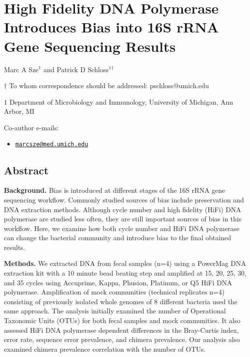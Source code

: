 \documentclass[12pt,]{article}
\title{}
\author{}
\date{}
\providecommand{\tightlist}{%
  \setlength{\itemsep}{0pt}\setlength{\parskip}{0pt}}
\begin{document}
\section{High Fidelity DNA Polymerase Introduces Bias into 16S rRNA Gene
Sequencing
Results}\label{high-fidelity-dna-polymerase-introduces-bias-into-16s-rrna-gene-sequencing-results}

\begin{center}
\vspace{25mm}

Marc A Sze${^1}$ and Patrick D Schloss${^1}$${^\dagger}$

\vspace{20mm}

$\dagger$ To whom correspondence should be addressed: pschloss@umich.edu

$1$ Department of Microbiology and Immunology, University of Michigan, Ann Arbor, MI




\end{center}

Co-author e-mails:

\begin{itemize}
\tightlist
\item
  \href{mailto:marcsze@med.umich.edu}{\nolinkurl{marcsze@med.umich.edu}}
\end{itemize}

\newpage

\linenumbers

\subsection{Abstract}\label{abstract}

\textbf{Background.} Bias is introduced at different stages of the 16S
rRNA gene sequencing workflow. Commonly studied sources of bias include
preservation and DNA extraction methods. Although cycle number and high
fidelity (HiFi) DNA polymerase are studied less often, they are still
important sources of bias in this workflow. Here, we examine how both
cycle number and HiFi DNA polymerase can change the bacterial community
and introduce bias to the final obtained results.

\textbf{Methods.} We extracted DNA from fecal samples (n=4) using a
PowerMag DNA extraction kit with a 10 minute bead beating step and
amplified at 15, 20, 25, 30, and 35 cycles using Accuprime, Kappa,
Phusion, Platinum, or Q5 HiFi DNA polymerase. Amplification of mock
communities (technical replicates n=4) consisting of previously isolated
whole genomes of 8 different bacteria used the same approach. The
analysis initially examined the number of Operational Taxonomic Units
(OTUs) for both fecal samples and mock communities. It also assessed
HiFi DNA polymerase dependent differences in the Bray-Curtis index,
error rate, sequence error prevalence, and chimera prevalence. Our
analysis also examined chimera prevalence correlation with the number of
OTUs.
\end{document}
